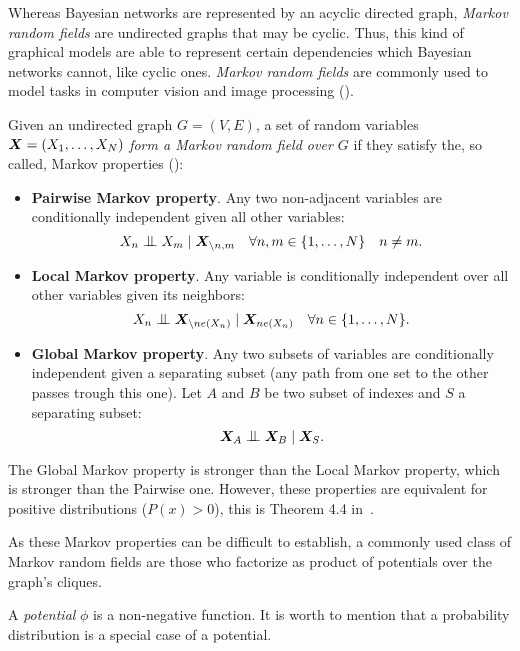 
Whereas Bayesian networks are represented by an acyclic directed graph, \emph{Markov random fields} are undirected graphs that may be cyclic. Thus, this kind of graphical models are able to represent certain dependencies which Bayesian networks cannot, like cyclic ones. \emph{Markov random fields} are commonly used to model tasks in computer vision and image processing (\cite{li2009markov}).

\begin{definition}
  Given an undirected graph \(G = (V, E)\), a set of random variables \(\bm{X} = (X_{1}, \dots, X_{N})\) \emph{form a Markov random field over \(G\)} if they satisfy the, so called, Markov properties (\cite{barber}):
  \begin{itemize}
  \item \textbf{Pairwise Markov property}. Any two non-adjacent variables are
      conditionally independent given all other variables:
      \[
      X_{n} \bigCI X_{m} \mid \bX_{\backslash n,m} \quad \forall n,m \in \{1,\dots,N\} \quad n \neq m.
      \]
    \item \textbf{Local Markov property}. Any variable is conditionally independent over all
    other variables given its neighbors:
    \[
      X_{n} \bigCI \bX_{\backslash ne(X_{n})} \mid \bX_{ne(X_{n})} \quad \forall n \in \{1,\dots,N\}.
      \]
  \item \textbf{Global Markov property}. Any two subsets of variables are conditionally
    independent given a separating subset (any path from one set to the other
      passes trough this one). Let \(A\) and \(B\) be two subset of indexes and \(S\) a separating subset:
      \[
      \bX_{A} \bigCI \bX_{B} \mid \bX_{S}.
      \]
  \end{itemize}

  The Global Markov property is stronger than the Local Markov property, which is stronger than the Pairwise one. However, these properties are equivalent for positive distributions (\(P(x) > 0\)), this is Theorem 4.4 in~\cite{koller_friedman}.
\end{definition}

As these Markov properties can be difficult to establish, a commonly used class of Markov random fields are those who factorize as product of potentials over the graph's cliques.

\begin{definition}
A \emph{potential} \(\phi\) is a non-negative function. It is worth to mention
that a probability distribution is a special case of a potential.
\end{definition}


